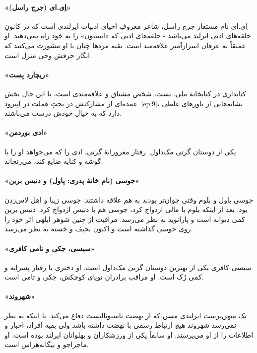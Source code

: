 \documentclass[12pt]{book}
\newcommand{\noun}[1]{«{#1}»}
\begin{document}
    \paragraph{\noun{اِی.ای (جرج راسل)}\protect{}}
    اِی.ای نام مستعار جرج راسل، شاعر معروفِ احیای ادبیات ایرلندی است که در کانونِ حلقه‌های ادبی ایرلند می‌باشد - حلقه‌های ادبی که \noun{استیون} را به خود راه نمی‌دهند. او عمیقاً به عرفان اسرارآمیز علاقه‌مند است. بقیه مردها چنان با او مشورت می‌کنند که انگار حرفش وحی منزل است.
    \paragraph{\noun{ریچارد بِست}\protect{}}
    کتابداری در کتابخانۀ ملی. بست، شخص مشتاق و علاقه‌مندی است، با این حال بخش عمده‌ای از مشارکتش در بحثِ هملت در اپیزود~\ref{ep:9}، نشانه‌هایی از باورهای غلطی دارد که به خیال خودش درست می‌باشند.
    \paragraph{\noun{ادی بوردمن}\protect{}}
    یکی از دوستان گرتی مک‌داول. رفتار مغرورانۀ گرتی، ادی را که می‌خواهد او را با گوشه و کنایه ضایع کند، می‌رنجاند.
    \paragraph{\noun{جوسی (نام خانۀ پدری: پاول) و دنیس برین}\protect{}}
    جوسی پاول و بلوم وقتی جوان‌تر بودند به هم علاقه داشتند. جوسی زیبا و اهل لاس‌زدن بود. بعد از اینکه بلوم با مالی ازدواج کرد، جوسی هم با دنیس ازدواج کرد. دنیس برین کمی دیوانه است و پارانوید به نظر می‌رسد. مراقبت از چنین شوهر ابلهی اثر خود را روی جوسی گذاشته است و اکنون نحیف و خسته به نظر می‌رسد.
    \paragraph{\noun{سیسی، جکی و تامی کافری}\protect{}}
    سیسی کافری یکی از بهترین دوستان گرتی مک‌داول است. او دختری با رفتار پسرانه و کمی رُک است. او مراقب برادران نوپای کوچکش، جکی و تامی است.
    \paragraph{\noun{شهروند}\protect{}}
    یک میهن‌پرست ایرلندی مسن که از نهضت ناسیونالیست دفاع می‌کند. با اینکه به نظر نمی‌رسد شهروند هیچ ارتباط رسمی با نهضت داشته باشد ولی بقیه افراد، اخبار و اطلاعات را از او می‌پرسند. او سابقاً یکی از ورزشکاران و پهلوانان ایرلند بوده است. او ماجراجو و بیگانه‌هراس است.
\end{document}
